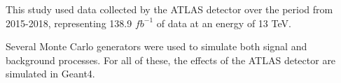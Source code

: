 This study used data collected by the ATLAS detector over the period from 2015-2018, representing 138.9 $fb^{-1}$ of data at an energy of 13 TeV. 

Several Monte Carlo generators were used to simulate both signal and background processes. For all of these, the effects of the ATLAS detector are simulated in Geant4. 
